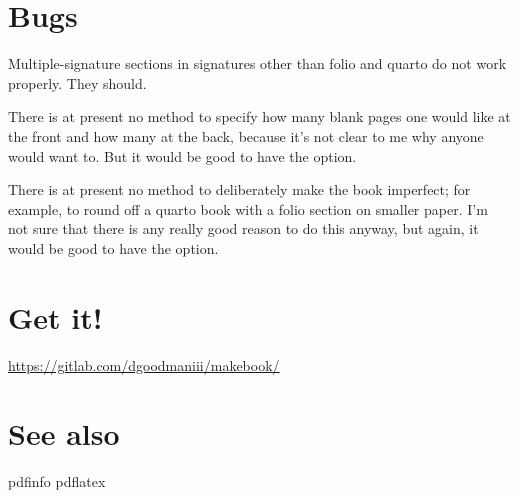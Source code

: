 \documentclass[12pt,twoside,final]{extarticle}
\begin{document}
\section{Bugs}
Multiple-signature sections in signatures other than folio and quarto do not work properly. They should.

There is at present no method to specify how many blank pages one would like at the front and how many at  the back, because it's not clear to me why anyone would want to. But it would be good to have the option.

There is at present no method to deliberately make the book imperfect; for example, to round off a quarto book with a folio section on smaller paper. I'm not sure that there is any really good reason to do this anyway, but again, it would be good to have the option.
\section{Get it!}
\href{https://gitlab.com/dgoodmaniii/makebook/}{https://gitlab.com/dgoodmaniii/makebook/} 
\section{See also}
pdfinfo pdflatex
\end{document}
